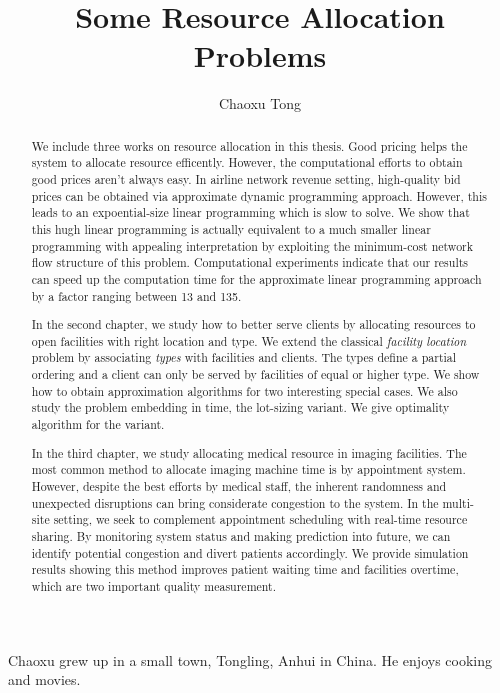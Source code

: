 \documentclass[phd,tocprelim]{cornell}
\title {Some Resource Allocation Problems}
\author {Chaoxu Tong}
\begin{document}
\maketitle
\makecopyright

\begin{abstract}
We include three works on resource allocation in this thesis. Good pricing helps the system to allocate resource efficently. However, the computational efforts to obtain good prices aren't always easy. In airline network revenue setting, high-quality bid prices can be obtained via approximate dynamic programming approach. However, this leads to an expoential-size linear programming which is slow to solve. We show that this hugh linear programming is actually equivalent to a much smaller linear programming with appealing interpretation by exploiting the minimum-cost network flow structure of this problem. Computational experiments indicate that our results can speed up the computation time for the approximate linear programming approach by a factor ranging between 13 and 135.

In the second chapter, we study how to better serve clients by allocating resources to open facilities with right location and type. We extend the classical \textit{facility location} problem by associating \textit{types} with facilities and clients. The types define a partial ordering and a client can only be served by facilities of equal or higher type. We show how to obtain approximation algorithms for two interesting special cases. We also study the problem embedding in time, the lot-sizing variant. We give optimality algorithm for the variant.

In the third chapter, we study allocating medical resource in imaging facilities. The most common method to allocate imaging machine time is by appointment system. However, despite the best efforts by medical staff, the inherent randomness and unexpected disruptions can bring considerate congestion to the system. In the multi-site setting, we seek to complement appointment scheduling with real-time resource sharing. By monitoring system status and making prediction into future, we can identify potential congestion and divert patients accordingly. We provide simulation results showing this method improves patient waiting time and facilities overtime, which are two important quality measurement.
\end{abstract}

\begin{biosketch}
Chaoxu grew up in a small town, Tongling, Anhui in China. He enjoys cooking and movies.
\end{biosketch}
\end{document}
